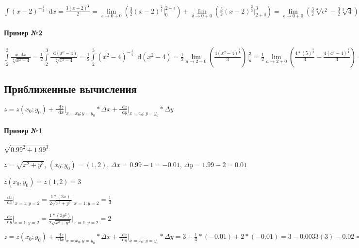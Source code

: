 \documentclass{article}
\newcommand*\diff{\mathop{}\!\mathrm{d}}
\begin{document}
$\int (x - 2)^{-\frac{1}{3}} \diff x = \frac{3 (x - 2)^{\frac{2}{3}}}{2} = \lim\limits_{e \to 0 + 0} (\frac{3}{2} (x - 2)^{\frac{2}{3}} \bigg|_{0}^{2 - \epsilon}) + \lim\limits_{\delta \to 0 + 0} (\frac{3}{2} (x - 2)^{\frac{2}{3}} \bigg|_{2 + \delta}^{3}) = \lim\limits_{\epsilon \to 0 + 0} (\frac{3}{2} \sqrt[3]{\epsilon^2} - \frac{3}{2} \sqrt[3]{4}) + \lim\limits_{\delta \to 0 + 0} (\frac{3}{2} - \frac{3}{2} \sqrt[3]{\delta^2}) = \frac{3}{2} (1 - \sqrt[3]{4})$

\paragraph{Пример №2}

$\int\limits_{2}^{3} \frac{x \diff x}{\sqrt[4]{x^2 - 4}} = \frac{1}{2} \int\limits_{2}^{3} \frac{\diff (x^2 - 4)}{\sqrt[4]{x^2 - 4}} = \frac{1}{2} \int\limits_{2}^{3} (x^2 - 4)^{-\frac{1}{4}} \diff (x^2 - 4) = \frac{1}{2} \lim\limits_{a \to 2 + 0} (\frac{4 (x^2 - 4)^{\frac{3}{4}}}{3}) \bigg|_{a}^{3} = \frac{1}{2} \lim\limits_{a \to 2 + 0} (\frac{4 * (5)^{\frac{3}{4}}}{3} - \frac{4 (a^2 - 4)^{\frac{3}{4}}}{3}) = \frac{2 * \sqrt[4]{5^3}}{3}$

\subsection{Приближенные вычисления}

$z = z (x_0; y_0) + \frac{\diff z}{\diff x} \bigg|_{x = x_0; y = y_0} * \Delta x + \frac{\diff z}{\diff y} \bigg|_{x = x_0; y = y_0} * \Delta y$

\paragraph{Пример №1}

$\sqrt{0.99^2 + 1.99^3}$

$z = \sqrt{x^2 + y^3}$, $(x_0; y_0) = (1, 2)$, $\Delta x = 0.99 - 1 = -0.01$, $\Delta y = 1.99 - 2 = 0.01$

$z(x_0, y_0) = z(1, 2) = 3$

$\frac{\diff z}{\diff x} \bigg|_{x = 1; y = 2} = \frac{1 * (2 x)}{2 \sqrt{x^2 + y^3}} \bigg|_{x = 1; y  = 2} = \frac{1}{3}$

$\frac{\diff z}{\diff y} \bigg|_{x = 1; y = 2} = \frac{1 * (3 y^2)}{2 \sqrt{x^2 + y^3}} \bigg|_{x = 1; y  = 2} = 2$

$z = z (x_0; y_0) + \frac{\diff z}{\diff x} \bigg|_{x = x_0; y = y_0} * \Delta x + \frac{\diff z}{\diff y} \bigg|_{x = x_0; y = y_0} * \Delta y = 3 + \frac{1}{3} * (-0.01) + 2 * (-0.01) = 3 - 0.0033(3) - 0.02 = 2.976(6)$
\end{document}
